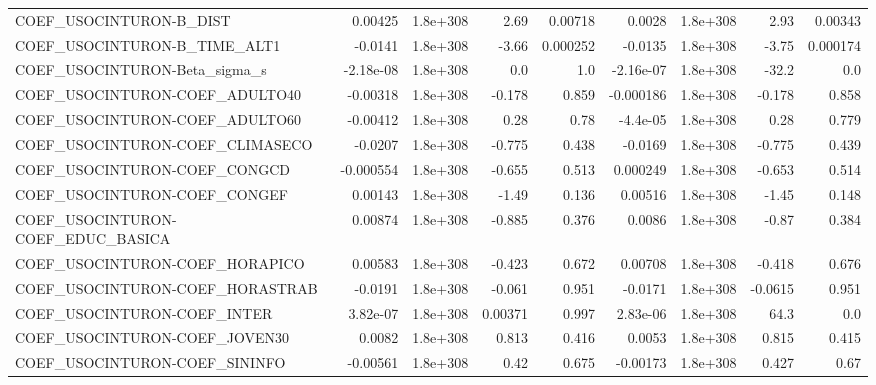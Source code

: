 \begin{tabular}{lrrrrrrrr}
COEF\_USOCINTURON-B\_DIST           &     0.00425 &     1.8e+308 &      2.69 &  0.00718 &     0.0028 &    1.8e+308 &         2.93 &       0.00343 \\
COEF\_USOCINTURON-B\_TIME\_ALT1      &     -0.0141 &     1.8e+308 &     -3.66 & 0.000252 &    -0.0135 &    1.8e+308 &        -3.75 &      0.000174 \\
COEF\_USOCINTURON-Beta\_sigma\_s     &   -2.18e-08 &     1.8e+308 &       0.0 &      1.0 &  -2.16e-07 &    1.8e+308 &        -32.2 &           0.0 \\
COEF\_USOCINTURON-COEF\_ADULTO40    &    -0.00318 &     1.8e+308 &    -0.178 &    0.859 &  -0.000186 &    1.8e+308 &       -0.178 &         0.858 \\
COEF\_USOCINTURON-COEF\_ADULTO60    &    -0.00412 &     1.8e+308 &      0.28 &     0.78 &   -4.4e-05 &    1.8e+308 &         0.28 &         0.779 \\
COEF\_USOCINTURON-COEF\_CLIMASECO   &     -0.0207 &     1.8e+308 &    -0.775 &    0.438 &    -0.0169 &    1.8e+308 &       -0.775 &         0.439 \\
COEF\_USOCINTURON-COEF\_CONGCD      &   -0.000554 &     1.8e+308 &    -0.655 &    0.513 &   0.000249 &    1.8e+308 &       -0.653 &         0.514 \\
COEF\_USOCINTURON-COEF\_CONGEF      &     0.00143 &     1.8e+308 &     -1.49 &    0.136 &    0.00516 &    1.8e+308 &        -1.45 &         0.148 \\
COEF\_USOCINTURON-COEF\_EDUC\_BASICA &     0.00874 &     1.8e+308 &    -0.885 &    0.376 &     0.0086 &    1.8e+308 &        -0.87 &         0.384 \\
COEF\_USOCINTURON-COEF\_HORAPICO    &     0.00583 &     1.8e+308 &    -0.423 &    0.672 &    0.00708 &    1.8e+308 &       -0.418 &         0.676 \\
COEF\_USOCINTURON-COEF\_HORASTRAB   &     -0.0191 &     1.8e+308 &    -0.061 &    0.951 &    -0.0171 &    1.8e+308 &      -0.0615 &         0.951 \\
COEF\_USOCINTURON-COEF\_INTER       &    3.82e-07 &     1.8e+308 &   0.00371 &    0.997 &   2.83e-06 &    1.8e+308 &         64.3 &           0.0 \\
COEF\_USOCINTURON-COEF\_JOVEN30     &      0.0082 &     1.8e+308 &     0.813 &    0.416 &     0.0053 &    1.8e+308 &        0.815 &         0.415 \\
COEF\_USOCINTURON-COEF\_SININFO     &    -0.00561 &     1.8e+308 &      0.42 &    0.675 &   -0.00173 &    1.8e+308 &        0.427 &          0.67 \\

\end{tabular}
